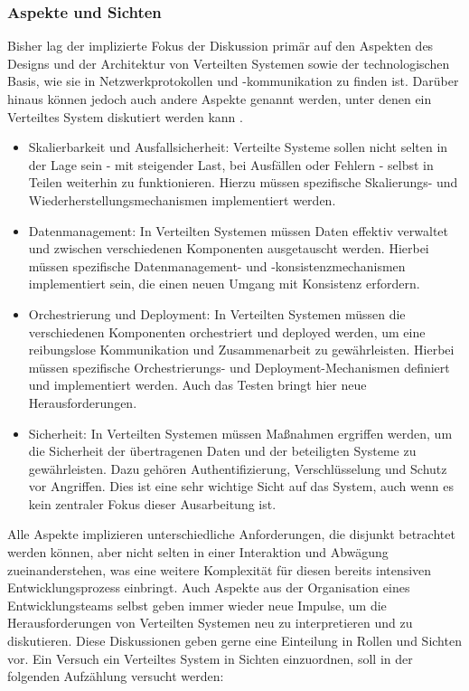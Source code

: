 \subsubsection{Aspekte und Sichten}
Bisher lag der implizierte Fokus der Diskussion primär auf den Aspekten des Designs und der Architektur von Verteilten Systemen sowie der technologischen Basis, wie sie in Netzwerkprotokollen und -kommunikation zu finden ist. Darüber hinaus können jedoch auch andere Aspekte genannt werden, unter denen ein Verteiltes System diskutiert werden kann \cite{tanenbaum2017distributed}. 
\begin{itemize} 
\item Skalierbarkeit und Ausfallsicherheit: Verteilte Systeme sollen nicht selten in der Lage sein -  mit steigender Last, bei Ausfällen oder Fehlern - selbst in Teilen weiterhin zu funktionieren. Hierzu müssen spezifische Skalierungs- und Wiederherstellungsmechanismen implementiert werden.
\item Datenmanagement: In Verteilten Systemen müssen Daten effektiv verwaltet und zwischen verschiedenen Komponenten ausgetauscht werden. Hierbei müssen spezifische Datenmanagement- und -konsistenzmechanismen implementiert sein, die einen neuen Umgang mit Konsistenz erfordern.
\item Orchestrierung und Deployment: In Verteilten Systemen müssen die verschiedenen Komponenten orchestriert und deployed werden, um eine reibungslose Kommunikation und Zusammenarbeit zu gewährleisten. Hierbei müssen spezifische Orchestrierungs- und Deployment-Mechanismen definiert und implementiert werden. Auch das Testen bringt hier neue Herausforderungen.
\item Sicherheit: In Verteilten Systemen müssen Maßnahmen ergriffen werden, um die Sicherheit der übertragenen Daten und der beteiligten Systeme zu gewährleisten. Dazu gehören Authentifizierung, Verschlüsselung und Schutz vor Angriffen. Dies ist eine sehr wichtige Sicht auf das System, auch wenn es kein zentraler Fokus dieser Ausarbeitung ist.
\end{itemize}	
Alle Aspekte implizieren unterschiedliche Anforderungen, die disjunkt betrachtet werden können, aber nicht selten in einer Interaktion und Abwägung zueinanderstehen, was eine weitere Komplexität für diesen bereits intensiven Entwicklungsprozess einbringt. Auch Aspekte aus der Organisation eines Entwicklungsteams selbst geben immer wieder neue Impulse, um die Herausforderungen von Verteilten Systemen neu zu interpretieren und zu diskutieren. Diese Diskussionen geben gerne eine Einteilung in Rollen und Sichten vor. Ein Versuch ein Verteiltes System in Sichten einzuordnen, soll in der folgenden Aufzählung versucht werden:
